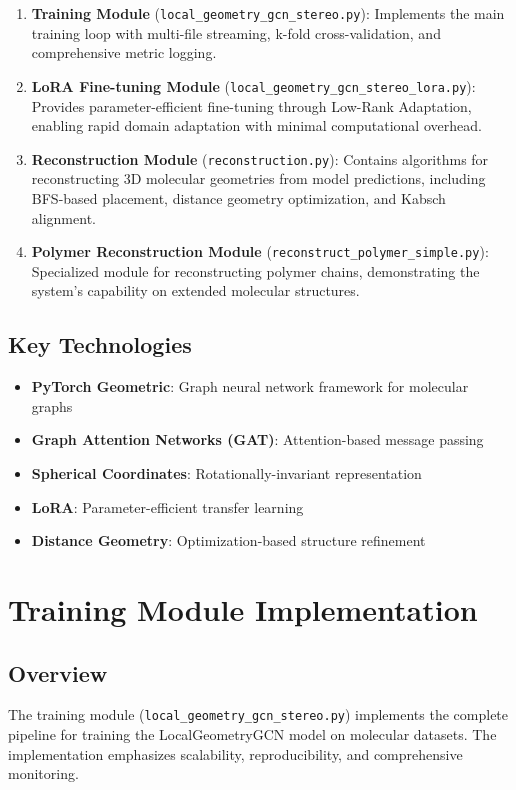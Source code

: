 \documentclass[11pt,a4paper]{article}
\begin{document}
\begin{enumerate}
    \item \textbf{Training Module} (\texttt{local\_geometry\_gcn\_stereo.py}): Implements the main training loop with multi-file streaming, k-fold cross-validation, and comprehensive metric logging.

    \item \textbf{LoRA Fine-tuning Module} (\texttt{local\_geometry\_gcn\_stereo\_lora.py}): Provides parameter-efficient fine-tuning through Low-Rank Adaptation, enabling rapid domain adaptation with minimal computational overhead.

    \item \textbf{Reconstruction Module} (\texttt{reconstruction.py}): Contains algorithms for reconstructing 3D molecular geometries from model predictions, including BFS-based placement, distance geometry optimization, and Kabsch alignment.

    \item \textbf{Polymer Reconstruction Module} (\texttt{reconstruct\_polymer\_simple.py}): Specialized module for reconstructing polymer chains, demonstrating the system's capability on extended molecular structures.
\end{enumerate}

\subsection{Key Technologies}
\begin{itemize}
    \item \textbf{PyTorch Geometric}: Graph neural network framework for molecular graphs
    \item \textbf{Graph Attention Networks (GAT)}: Attention-based message passing
    \item \textbf{Spherical Coordinates}: Rotationally-invariant representation
    \item \textbf{LoRA}: Parameter-efficient transfer learning
    \item \textbf{Distance Geometry}: Optimization-based structure refinement
\end{itemize}

\clearpage

\section{Training Module Implementation}

\subsection{Overview}
The training module (\texttt{local\_geometry\_gcn\_stereo.py}) implements the complete pipeline for training the LocalGeometryGCN model on molecular datasets. The implementation emphasizes scalability, reproducibility, and comprehensive monitoring.
\end{document}
